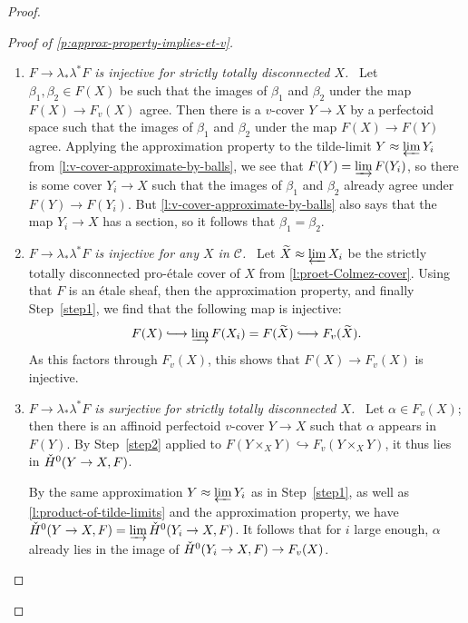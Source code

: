 \documentclass[10pt,a4paper]{article}
\theoremstyle{definition}
\theoremstyle{remark}
\newcommand*{\longhookrightarrow}{\lhook\joinrel\longrightarrow}
\newcommand{\wt}{\widetilde}
\newcommand{\cH}{{\ifmmode \check{H}\else{\v{C}ech}\fi}}
\numberwithin{equation}{section}
\begin{document}
\begin{proof}
\begin{proof}[Proof of \cref{p:approx-property-implies-et-v}]
\begin{enumerate}[label={\emph{Step}~\arabic*:}, ref=\arabic*,wide]
\item\label{step1} \emph{$F\to \lambda_{\ast}\lambda^{\ast}F$ is injective for strictly totally disconnected $X$.}~
		Let $\beta_1,\beta_2\in F(X)$ be such that the images of $\beta_1$ and $\beta_2$ under the map $F(X)\to F_v(X)$ agree. Then there is a $v$-cover $Y\to X$ by a perfectoid space such that the images of $\beta_1$ and $\beta_2$ under the map $F(X)\to F(Y)$ agree. Applying the approximation property to  the tilde-limit $Y\approx \varprojlim Y_i$ from \cref{l:v-cover-approximate-by-balls}, we see that $F(Y)=\varinjlim F(Y_i)$,
		so there is some cover $Y_i\to X$ such that the images of $\beta_1$ and $\beta_2$ already agree under  $F(Y)\to F(Y_i)$. But \cref{l:v-cover-approximate-by-balls} also says that the map $Y_i\to X$ has a section,  so it follows that $\beta_1=\beta_2$.

\item\label{step2} \emph{$F\to \lambda_{\ast}\lambda^{\ast}F$ is injective for any $X$ in $\mathcal C$.}~
		Let $\wt X\approx \varprojlim X_i$ be the strictly totally disconnected pro-\'etale cover of $X$ from \cref{l:proet-Colmez-cover}. Using that $F$ is an \'etale sheaf, then the approximation property, and finally Step~\ref{step1}, we find that the following map is injective:
		\[F(X)\longhookrightarrow \varinjlim F(X_i)=F(\wt X)\longhookrightarrow F_v(\wt X).\]
		As this factors through $F_v(X)$, this shows that $F(X)\to F_v(X)$ is injective. 
		
\item\label{step3} \emph{$F\to \lambda_{\ast}\lambda^{\ast}F$ is surjective for strictly totally disconnected $X$.}~
		Let $\alpha \in F_v(X)$; then there is an affinoid perfectoid $v$-cover $Y\to X$ such that $\alpha$ appears in $F(Y)$. By Step~\ref{step2} applied to $F(Y\times_XY)\hookrightarrow F_v(Y\times_XY)$, it thus lies in $\cH^0(Y\to X,F)$.
		
		 By the same approximation $Y\approx\varprojlim Y_i$ as in Step~\ref{step1}, as well as \cref{l:product-of-tilde-limits} and the approximation property, we have $\cH^0(Y\to X,F)=\varinjlim \cH^0(Y_i\to X,F)$. It follows that for $i$ large enough, $\alpha$ already lies in the image of 
		$\cH^0(Y_i\to X,F)\to F_v(X)$.
		

\end{enumerate}
\end{proof}
\end{proof}
\end{document}
